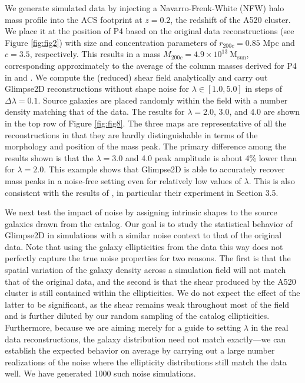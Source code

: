 \documentclass[iop,twocolappendix]{emulateapj}
\newcommand{\cta}[1]{\citetalias{#1}}
\begin{document}
We generate simulated data by injecting a Navarro-Frenk-White (NFW) \citep{NFW.1997} halo mass 
profile into the ACS footprint at $z=0.2$, the redshift of the A520 cluster. We place it at 
the position of P4 based on the original data reconstructions (see Figure \ref{fig:fig2}) with 
size and concentration parameters of $r_{200c}=0.85$ Mpc and $c=3.5$, respectively. This results 
in a mass $M_{200c}=4.9 \times 10^{13}~\mathrm{M}_\mathrm{sun}$, corresponding approximately to 
the average of the column masses derived for P4 in \cta{C12} and \cta{J14}. We compute the 
(reduced) shear field analytically \citep{WB.2000} and carry out Glimpse2D reconstructions 
without shape noise for $\lambda\in[1.0, 5.0]$ in steps of $\Delta\lambda=0.1$. Source galaxies 
are placed randomly within the field with a number density matching that of the \cta{J14} data.
The results for $\lambda=2.0$, 3.0, and 4.0 are shown in the top row of Figure \ref{fig:fig8}. 
The three maps are representative of all the reconstructions in that they are hardly 
distinguishable in terms of the morphology and position of the mass peak. The primary difference 
among the results shown is that the $\lambda=3.0$ and 4.0 peak amplitude is about 4\% lower than 
for $\lambda=2.0$. This example shows that Glimpse2D is able to accurately recover mass peaks 
in a noise-free setting even for relatively low values of $\lambda$. This is also consistent 
with the results of \citet{LSL.etal.2016}, in particular their experiment in Section 3.5.

We next test the impact of noise by assigning intrinsic shapes to the source galaxies drawn from
the \cta{J14} catalog. Our goal is to study the statistical behavior of Glimpse2D in simulations 
with a similar noise context to that of the original data. Note that using the galaxy 
ellipticities from the data this way does not perfectly capture the true noise properties for two reasons. 
The first is that the spatial variation of the galaxy density across a simulation field will not 
match that of the original data, and the second is that the shear produced by the A520 cluster is
still contained within the ellipticities. 
We do not expect the effect of the latter to be significant, as the shear remains weak throughout
most of the field and is further diluted by our random sampling of the catalog ellipticities.
Furthermore, because we are aiming merely for a guide to setting $\lambda$ in the real data 
reconstructions, the galaxy distribution need not match exactly---we can establish the 
expected behavior on average by carrying out a large number realizations of the noise where
the ellipticity distributions still match the data well. We have generated 1000 such noise 
simulations.
\end{document}
